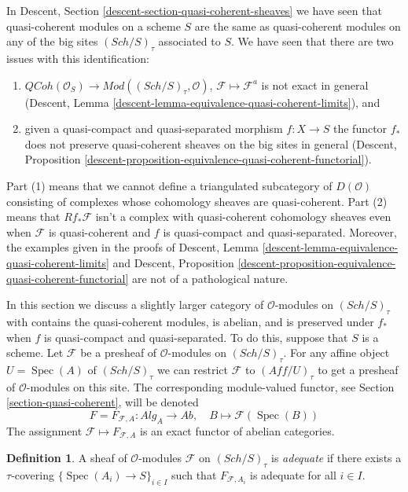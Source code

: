 \documentclass{stacks-project}
\theoremstyle{plain}
\theoremstyle{definition}
\newtheorem{definition}[subsection]{Definition}
\theoremstyle{remark}
\numberwithin{equation}{subsection}
\def\Spec{\mathop{\mathrm{Spec}}}
\def\Sch{\mathit{Sch}}
\def\QCoh{\mathit{QCoh}}
\begin{document}
\noindent
In
Descent, Section \ref{descent-section-quasi-coherent-sheaves}
we have seen that quasi-coherent modules on a scheme $S$
are the same as quasi-coherent modules on any of the big
sites $(\Sch/S)_\tau$ associated to $S$. We have seen that there
are two issues with this identification:
\begin{enumerate}
\item $\QCoh(\mathcal{O}_S) \to
\textit{Mod}((\Sch/S)_\tau, \mathcal{O})$,
$\mathcal{F} \mapsto \mathcal{F}^a$ is not exact in general
(Descent, Lemma \ref{descent-lemma-equivalence-quasi-coherent-limits}), and
\item given a quasi-compact and quasi-separated morphism $f : X \to S$
the functor $f_*$ does not preserve quasi-coherent sheaves on the
big sites in general (Descent, Proposition
\ref{descent-proposition-equivalence-quasi-coherent-functorial}).
\end{enumerate}
Part (1) means that we cannot define a triangulated subcategory
of $D(\mathcal{O})$ consisting of complexes whose cohomology sheaves
are quasi-coherent. Part (2) means that $Rf_*\mathcal{F}$ isn't a
complex with quasi-coherent cohomology sheaves even when $\mathcal{F}$
is quasi-coherent and $f$ is quasi-compact and quasi-separated.
Moreover, the examples given in the proofs of
Descent, Lemma
\ref{descent-lemma-equivalence-quasi-coherent-limits}
and
Descent, Proposition
\ref{descent-proposition-equivalence-quasi-coherent-functorial}
are not of a pathological nature.

\medskip\noindent
In this section we discuss a slightly larger category
of $\mathcal{O}$-modules on $(\Sch/S)_\tau$ with contains the
quasi-coherent modules, is abelian, and is preserved under $f_*$ when
$f$ is quasi-compact and quasi-separated.
To do this, suppose that $S$ is a scheme. Let $\mathcal{F}$ be a presheaf
of $\mathcal{O}$-modules on $(\Sch/S)_\tau$.
For any affine object $U = \Spec(A)$ of $(\Sch/S)_\tau$
we can restrict $\mathcal{F}$ to $(\textit{Aff}/U)_\tau$ to get
a presheaf of $\mathcal{O}$-modules on this site. The corresponding
module-valued functor, see
Section \ref{section-quasi-coherent},
will be denoted
$$
F = F_{\mathcal{F}, A} :
\textit{Alg}_A \longrightarrow \textit{Ab},
\quad
B \longmapsto \mathcal{F}(\Spec(B))
$$
The assignment $\mathcal{F} \mapsto F_{\mathcal{F}, A}$ is an exact
functor of abelian categories.

\begin{definition}
\label{definition-adequate}
A sheaf of $\mathcal{O}$-modules $\mathcal{F}$ on $(\Sch/S)_\tau$ is
{\it adequate} if there exists a $\tau$-covering
$\{\Spec(A_i) \to S\}_{i \in I}$ such that $F_{\mathcal{F}, A_i}$ is
adequate for all $i \in I$.
\end{definition}
\end{document}
